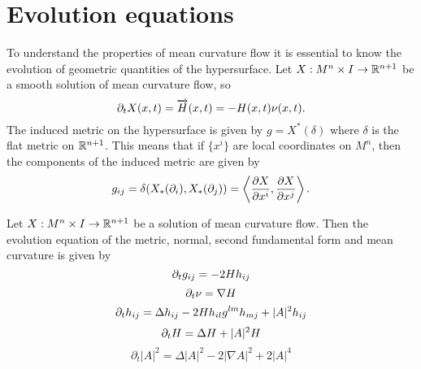 \section{Evolution equations}
To understand the properties of mean curvature flow it is essential to know the evolution of geometric quantities of the hypersurface. Let $X : M^n \times I \to \mathbb{R}^{n+1}$ be a smooth solution of mean curvature flow, so 
\[ \partial_t X(x,t) = \overrightarrow{H}(x,t)  = -H(x,t)\nu(x,t).\]
The induced metric on the hypersurface is given by $g = X^*(\delta)$ where $\delta$ is the flat metric on $\mathbb{R}^{n+1}$. This means that if $\{x^i\}$ are local coordinates on $M^n$, then the components of the induced metric are given by
\[ g_{ij} = \delta(X_*(\partial_i),X_*(\partial_j)) = \left\langle  \frac{\partial X}{\partial x^i}, \frac{\partial X}{\partial x^j} \right\rangle.  \]
\begin{lemma}\label{evolutioneq}
     Let $X: M^n \times I \to \mathbb{R}^{n+1}$ be a solution of mean curvature flow. Then the evolution equation of the metric, normal, second fundamental form and mean curvature is given by
\begin{equation}
    \partial_t g_{ij} = -2Hh_{ij}
\end{equation}
\begin{equation}
\partial_t \nu  = \nabla H
\end{equation}
\begin{equation}
\partial_t h_{ij} = \Delta h_{ij} - 2Hh_{il}g^{lm}h_{mj}+|A|^2h_{ij}
\end{equation}
\begin{equation}
    \partial_t H = \Delta H + |A|^2H \label{dtH}
\end{equation}
\begin{equation}
    \partial_{t}|A|^{2} = \Delta |A|^{2}-2|\nabla A|^{2} + 2|A|^{4}
\end{equation}
\end{lemma}
